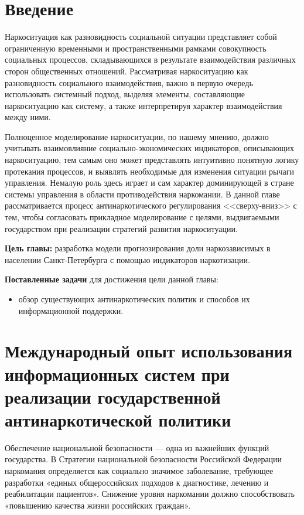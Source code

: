 \section*{Введение}

Наркоситуация как разновидность социальной ситуации представляет собой 
ограниченную временными и пространственными рамками совокупность социальных 
процессов, складывающихся в результате взаимодействия различных сторон 
общественных отношений.  Рассматривая наркоситуацию как разновидность 
социального взаимодействия, важно в первую очередь использовать системный 
подход, выделяя элементы, составляющие наркоситуацию как систему, а также 
интерпретируя характер взаимодействия между ними.

Полноценное моделирование наркоситуации, по нашему мнению, должно учитывать 
взаимовлияние социально-экономических индикаторов, описывающих наркоситуацию, 
тем самым оно может представлять интуитивно понятную логику протекания 
процессов, и выявлять необходимые для изменения ситуации рычаги управления.  
Немалую роль здесь играет и сам характер доминирующей в стране системы 
управления в области противодействия наркомании.  В данной главе 
рассматривается процесс антинаркотического регулирования <<сверху-вниз>> с тем, 
чтобы согласовать прикладное моделирование с целями, выдвигаемыми государством 
при реализации стратегий развития наркоситуации.

\textbf{Цель главы:} разработка модели прогнозирования доли наркозависимых в 
населении Санкт-Петербурга с помощью индикаторов наркотизации.

\textbf{Поставленные задачи} для достижения цели данной главы:
\begin{itemize}
    \item обзор существующих антинаркотических политик и способов их 
        информационной поддержки.
\end{itemize} 



\newpage
\section{Международный опыт использования информационных систем при реализации 
    государственной антинаркотической политики}

Обеспечение национальной безопасности — одна из важнейших функций государства.  
В Стратегии национальной безопасности Российской Федерации 
\cite{ru_nat_def_strat} наркомания определяется как социально значимое 
заболевание, требующее разработки «единых общероссийских подходов к диагностике, 
лечению и реабилитации пациентов».  Снижение уровня наркомании должно 
способствовать «повышению качества жизни российских граждан».

